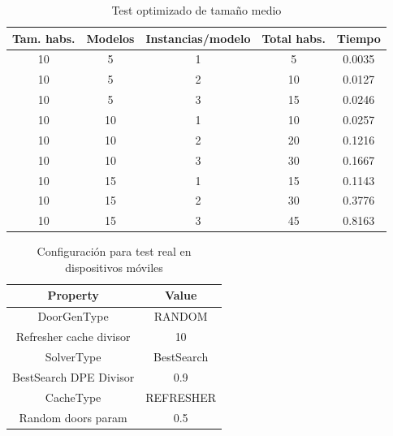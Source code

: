 \begin{table}[H]
\begin{center}
	\begin{tabular}{ | c | c | c | c | c | }
\hline
Tam. habs. & Modelos & Instancias/modelo & Total habs. & Tiempo \\ \hline 
10 & 5 & 1 & 5 & 0.0035 \\ 
10 & 5 & 2 & 10 & 0.0127 \\ 
10 & 5 & 3 & 15 & 0.0246 \\ 
10 & 10 & 1 & 10 & 0.0257 \\ 
10 & 10 & 2 & 20 & 0.1216 \\ 
10 & 10 & 3 & 30 & 0.1667 \\ 
10 & 15 & 1 & 15 & 0.1143 \\ 
10 & 15 & 2 & 30 & 0.3776 \\ 
10 & 15 & 3 & 45 & 0.8163 \\ 
\hline
	\end{tabular}
\end{center}
\caption{Test optimizado de tamaño medio}
\label{table:bsoptmedsamp}
\end{table}


\begin{table}[H]
\begin{center}
	\begin{tabular}{ | c | c | }
\hline
 		Property & Value \\ \hline
DoorGenType & RANDOM \\ 
Refresher cache divisor & 10 \\ 
SolverType & BestSearch \\ 
BestSearch DPE Divisor & 0.9 \\ 
CacheType & REFRESHER \\ 
Random doors param & 0.5 \\ 
\hline
	\end{tabular}
\end{center}
\caption{Configuración para test real en dispositivos móviles}
\label{table:cfg-optreal}
\end{table}


